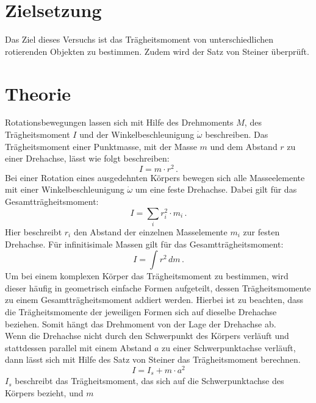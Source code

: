 \section{Zielsetzung}
\label{sec:Zielsetzung}
Das Ziel dieses Versuchs ist das Trägheitsmoment von unterschiedlichen rotierenden Objekten zu bestimmen. 
Zudem wird der Satz von Steiner überprüft.
%
\section{Theorie}
\label{sec:Theorie}
Rotationsbewegungen lassen sich mit Hilfe des Drehmoments $M$, des Trägheitsmoment $I$ und 
der Winkelbeschleunigung $\dot{\omega}$ beschreiben. Das Trägheitsmoment einer Punktmasse, 
mit der Masse $m$ und dem Abstand $r$ zu einer Drehachse, lässt wie folgt beschreiben:
\begin{equation}
    I = m \cdot r^{2}\,.
    \label{eqn:TragheitPunktmasse}
\end{equation}
%
Bei einer Rotation eines ausgedehnten Körpers bewegen sich alle Masseelemente mit einer 
Winkelbeschleunigung $\dot{\omega}$ um eine feste Drehachse. Dabei gilt für das Gesamtträgheitsmoment:
\begin{equation}
    I = \sum_i r_{i}^{2} \cdot m_{i}\, .
    \label{eqn:GesamttragheitSumme}
\end{equation}
%
Hier beschreibt $r_{i}$ den Abstand der einzelnen Masselemente $m_{i}$ zur festen Drehachse.
Für infinitisimale Massen gilt für das Gesamtträgheitsmoment:
\begin{equation}
    I = \int r^{2}\,dm \,.
    \label{eqn:GesamttragheitIntegral}
\end{equation}
%
Um bei einem komplexen Körper das Trägheitsmoment zu bestimmen, wird dieser häufig in 
geometrisch einfache Formen aufgeteilt, dessen Trägheitsmomente zu einem Gesamtträgheitsmoment 
addiert werden. Hierbei ist zu beachten, dass die Trägheitsmomente der jeweiligen Formen sich
auf dieselbe Drehachse beziehen. Somit hängt das Drehmoment von der Lage der Drehachse ab. \\
%
Wenn die Drehachse nicht durch den Schwerpunkt des Körpers verläuft und stattdessen parallel 
mit einem Abstand $a$ zu einer Schwerpunktachse verläuft, dann lässt sich mit Hilfe des Satz von Steiner
das Trägheitsmoment berechnen.
\begin{equation}
    I = I_{s} + m \cdot a^{2}
    \label{eqn:SatzVonSteiner}
\end{equation}
%
$I_{s}$ beschreibt das Trägheitsmoment, das sich auf die Schwerpunktachse des Körpers bezieht, und $m$
